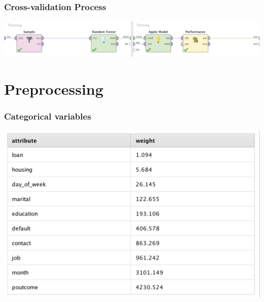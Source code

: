 \documentclass{beamer}
\begin{document}
\begin{frame}
	\frametitle{Cross-validation Process}
  \includegraphics[width=\textwidth,height=\textheight,keepaspectratio]{x-val-process}
\end{frame}

\section{Preprocessing} %

\begin{frame}
	\frametitle{Categorical variables}
  \includegraphics[width=\textwidth,height=\textheight,keepaspectratio]{chi-squared-table}
\end{frame}
\end{document}
